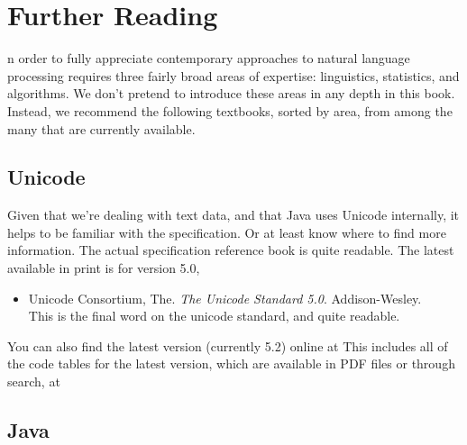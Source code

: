 \chapter{Further Reading}\label{appendix:reading}

n order to fully appreciate contemporary approaches to natural language
processing requires three fairly broad areas of expertise:
linguistics, statistics, and algorithms.  We don't pretend to
introduce these areas in any depth in this book.  Instead, we
recommend the following textbooks, sorted by area, from among the many
that are currently available.

\section{Unicode}

Given that we're dealing with text data, and that Java uses Unicode
internally, it helps to be familiar with the specification.  Or at
least know where to find more information.  The actual specification
reference book is quite readable.  The latest available in print is
for version 5.0,
%
\begin{itemize}
\item Unicode Consortium, The.  
{\it The Unicode Standard 5.0}.  
Addison-Wesley.
\\
{\footnotesize This is the final word on the unicode standard, and
quite readable.}
\end{itemize}
%
You can also find the latest version (currently 5.2) online at
%
%
This includes all of the code tables for the latest version, which are
available in PDF files or through search, at 
%
\begin{quote}
\end{quote}


\section{Java}

